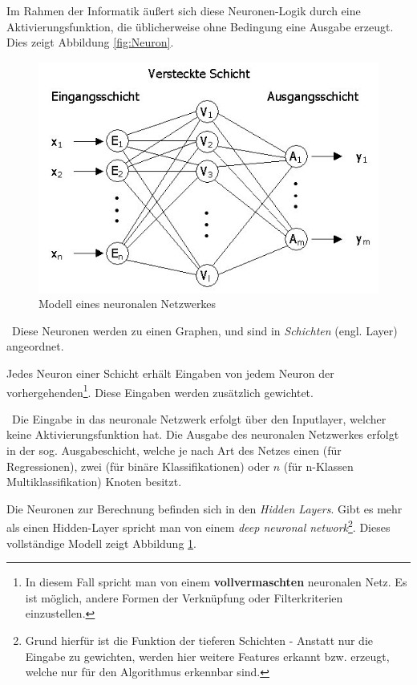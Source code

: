Im Rahmen der Informatik äußert sich diese Neuronen-Logik durch eine Aktivierungsfunktion, die üblicherweise ohne Bedingung eine Ausgabe erzeugt. Dies zeigt Abbildung \ref{fig:Neuron}.
\begin{figure}[h]
\begin{center}
	\includegraphics[width=0.9\linewidth]{Bilder/petry19}
	\caption[Modell eines neuronalen Netzwerkes: \newline\tiny\url{
		http://www.jurpc.de/jurpc/show?id=19990187}\normalsize]{Modell eines neuronalen Netzwerkes}
	\label{fig:NN-Modell}
\end{center}
\end{figure}
~\newline Diese Neuronen werden zu einen Graphen, und sind in \textit{Schichten} (engl. Layer) angeordnet. 

Jedes Neuron einer Schicht erhält Eingaben von jedem Neuron der vorhergehenden\footnote{In diesem Fall spricht man von einem \textbf{vollvermaschten} neuronalen Netz. Es ist möglich, andere Formen der Verknüpfung oder Filterkriterien einzustellen.}. Diese Eingaben werden zusätzlich gewichtet. 

~\newline Die Eingabe in das neuronale Netzwerk erfolgt über den Inputlayer, welcher keine Aktivierungsfunktion hat. Die Ausgabe des neuronalen Netzwerkes erfolgt in der sog. Ausgabeschicht, welche je nach Art des Netzes einen (für Regressionen), zwei (für binäre Klassifikationen) oder $n$ (für n-Klassen Multiklassifikation) Knoten besitzt.

Die Neuronen zur Berechnung befinden sich in den \textit{Hidden Layers}. Gibt es mehr als einen Hidden-Layer spricht man von einem \textit{deep neuronal network}\footnote{Grund hierfür ist die Funktion der tieferen Schichten - Anstatt nur die Eingabe zu gewichten, werden hier weitere Features erkannt bzw. erzeugt, welche nur für den Algorithmus erkennbar sind.}. Dieses vollständige Modell zeigt Abbildung \ref{fig:NN-Modell}.

